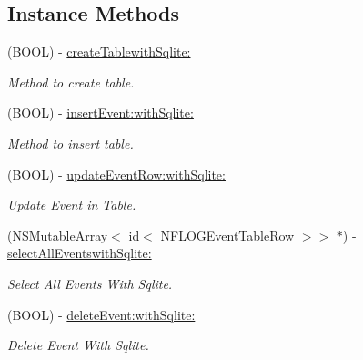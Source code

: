 \subsection*{Instance Methods}
\begin{DoxyCompactItemize}
\item 
\mbox{\label{protocol_n_f_l_o_g_event_table_01-p_a4548281e6c33bf710a5ed21cb501f375}} 
(B\+O\+OL) -\/ \hyperlink{protocol_n_f_l_o_g_event_table_01-p_a4548281e6c33bf710a5ed21cb501f375}{create\+Tablewith\+Sqlite\+:}
\begin{DoxyCompactList}\small\item\em Method to create table. \end{DoxyCompactList}\item 
\mbox{\label{protocol_n_f_l_o_g_event_table_01-p_a5207d766aeab95615fee7061d3c5aa57}} 
(B\+O\+OL) -\/ \hyperlink{protocol_n_f_l_o_g_event_table_01-p_a5207d766aeab95615fee7061d3c5aa57}{insert\+Event\+:with\+Sqlite\+:}
\begin{DoxyCompactList}\small\item\em Method to insert table. \end{DoxyCompactList}\item 
\mbox{\label{protocol_n_f_l_o_g_event_table_01-p_a99968b8ef1cefcefe7cf93ecf701df05}} 
(B\+O\+OL) -\/ \hyperlink{protocol_n_f_l_o_g_event_table_01-p_a99968b8ef1cefcefe7cf93ecf701df05}{update\+Event\+Row\+:with\+Sqlite\+:}
\begin{DoxyCompactList}\small\item\em Update Event in Table. \end{DoxyCompactList}\item 
\mbox{\label{protocol_n_f_l_o_g_event_table_01-p_a6f739f337cfe83061fd3ce5dac2aff9a}} 
(N\+S\+Mutable\+Array$<$ id$<$ N\+F\+L\+O\+G\+Event\+Table\+Row $>$$>$ $\ast$) -\/ \hyperlink{protocol_n_f_l_o_g_event_table_01-p_a6f739f337cfe83061fd3ce5dac2aff9a}{select\+All\+Eventswith\+Sqlite\+:}
\begin{DoxyCompactList}\small\item\em Select All Events With Sqlite. \end{DoxyCompactList}\item 
\mbox{\label{protocol_n_f_l_o_g_event_table_01-p_a3441d672e63f2ef47fe79b17d70535b3}} 
(B\+O\+OL) -\/ \hyperlink{protocol_n_f_l_o_g_event_table_01-p_a3441d672e63f2ef47fe79b17d70535b3}{delete\+Event\+:with\+Sqlite\+:}
\begin{DoxyCompactList}\small\item\em Delete Event With Sqlite. \end{DoxyCompactList}\end{DoxyCompactItemize}


